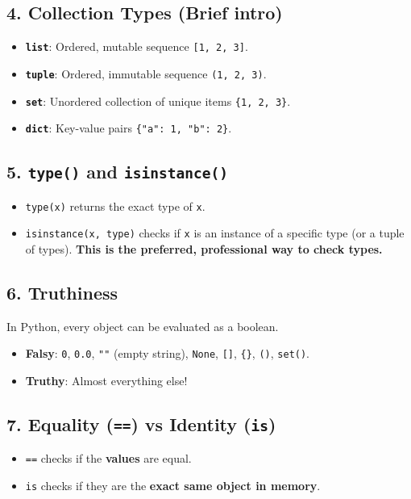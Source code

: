 \subsection{4. Collection Types (Brief intro)}
\begin{itemize}
    \item \textbf{\texttt{list}}: Ordered, mutable sequence \texttt{[1, 2, 3]}.
    \item \textbf{\texttt{tuple}}: Ordered, immutable sequence \texttt{(1, 2, 3)}.
    \item \textbf{\texttt{set}}: Unordered collection of unique items \texttt{\{1, 2, 3\}}.
    \item \textbf{\texttt{dict}}: Key-value pairs \texttt{\{"a": 1, "b": 2\}}.
\end{itemize}

\subsection{5. \texttt{type()} and \texttt{isinstance()}}
\begin{itemize}
    \item \texttt{type(x)} returns the exact type of \texttt{x}.
    \item \texttt{isinstance(x, type)} checks if \texttt{x} is an instance of a specific type (or a tuple of types). \textbf{This is the preferred, professional way to check types.}
\end{itemize}

\subsection{6. Truthiness}
In Python, every object can be evaluated as a boolean.
\begin{itemize}
    \item \textbf{Falsy}: \texttt{0}, \texttt{0.0}, \texttt{""} (empty string), \texttt{None}, \texttt{[]}, \texttt{\{\}}, \texttt{()}, \texttt{set()}.
    \item \textbf{Truthy}: Almost everything else!
\end{itemize}

\subsection{7. Equality (\texttt{==}) vs Identity (\texttt{is})}
\begin{itemize}
    \item \texttt{==} checks if the \textbf{values} are equal.
    \item \texttt{is} checks if they are the \textbf{exact same object in memory}.
\end{itemize}

